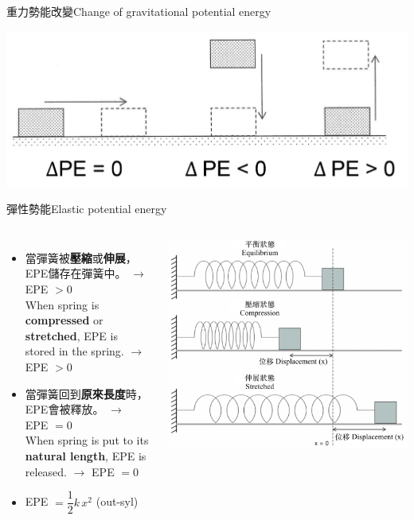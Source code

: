 \documentclass[beamer=true]{standalone}
\begin{document}
\begin{frame}{重力勢能改變Change of gravitational potential energy}\par
    {\par\centering
        \includegraphics[width=.8\textwidth]{assets/0a3fcefd.png}
        \par}
\end{frame}

\begin{frame}{彈性勢能Elastic potential energy}
    \begin{columns}
        \begin{itemize}
            \setlength{\itemsep}{15pt}
            \item 當彈簧被\textbf{壓縮}或\textbf{伸展}，EPE儲存在彈簧中。 $\rightarrow$ EPE $>0$\\When spring is \textbf{compressed} or \textbf{stretched}, EPE is stored in the spring. $\rightarrow$ EPE $>0$
            \item 當彈簧回到\textbf{原來長度}時，EPE會被釋放。 $\rightarrow$ EPE $=0$\\When spring is put to its \textbf{natural length}, EPE is released. $\rightarrow$ EPE $=0$
            \item EPE $=\dfrac{1}{2}k\, x^2$ (out-syl)
        \end{itemize}
        {\par\centering
            \includegraphics[width=\textwidth]{assets/5c1cf9fc.png}
            \par}
    \end{columns}
\end{frame}
\end{document}
